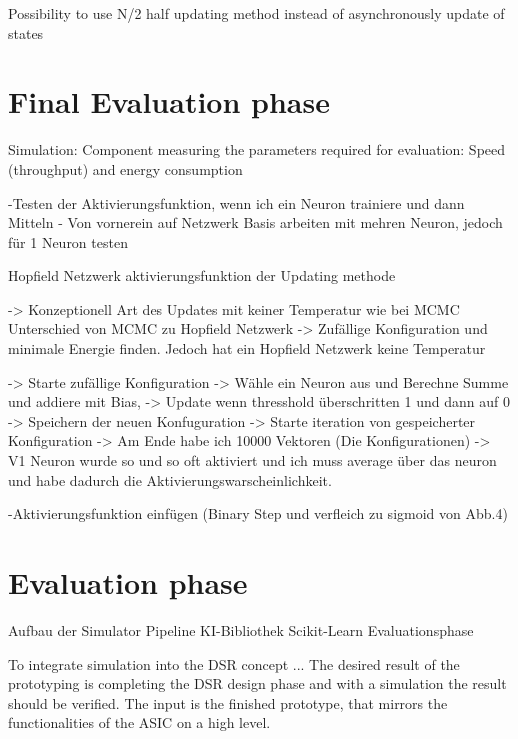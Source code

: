 Possibility to use N/2 half updating method instead of asynchronously update of states

\section{Final Evaluation phase}

Simulation: Component measuring the parameters required for evaluation: Speed (throughput) and energy consumption


-Testen der Aktivierungsfunktion, wenn ich ein Neuron trainiere und dann Mitteln 
- Von vornerein auf Netzwerk Basis arbeiten mit mehren Neuron, jedoch für 1 Neuron testen



Hopfield Netzwerk aktivierungsfunktion der Updating methode

-> Konzeptionell Art des Updates mit keiner Temperatur wie bei MCMC 
Unterschied von MCMC zu Hopfield Netzwerk -> Zufällige Konfiguration und minimale Energie finden. Jedoch hat ein Hopfield
Netzwerk keine Temperatur 

-> Starte zufällige Konfiguration
-> Wähle ein Neuron aus und Berechne Summe und addiere mit Bias, 
-> Update wenn thresshold überschritten 1 und dann auf 0 
-> Speichern der neuen Konfuguration 
-> Starte iteration von gespeicherter Konfiguration 
-> Am Ende habe ich 10000 Vektoren (Die Konfigurationen) -> V1 Neuron wurde so und so oft aktiviert und ich muss average
über das neuron und habe dadurch die Aktivierungswarscheinlichkeit.

-Aktivierungsfunktion einfügen (Binary Step und verfleich zu sigmoid von Abb.4)



\section{Evaluation phase}

Aufbau der Simulator Pipeline
KI-Bibliothek Scikit-Learn
Evaluationsphase

To integrate simulation into the DSR concept ... 
The desired result of the prototyping is completing the \ac{DSR} design phase and with a simulation the result should be verified.
The input is the finished prototype, that mirrors the functionalities of the \ac{ASIC} on a high level.
